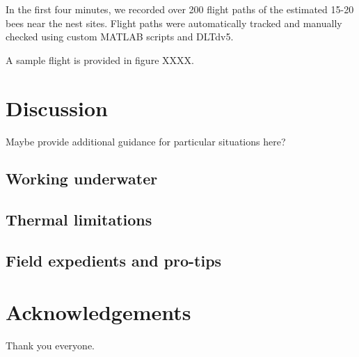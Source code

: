 \documentclass[fleqn,10pt]{wlpeerj}
\begin{document}
In the first four minutes, we recorded over 200 flight paths of the estimated 15-20 bees near the nest sites.  Flight paths were automatically tracked and manually checked using custom MATLAB scripts and DLTdv5.  

A sample flight is provided in figure XXXX.  

  
\section*{Discussion}
Maybe provide additional guidance for particular situations here?
\subsection*{Working underwater}

\subsection*{Thermal limitations}
\subsection*{Field expedients and pro-tips}

\section*{Acknowledgements}
Thank you everyone.


\end{document}
